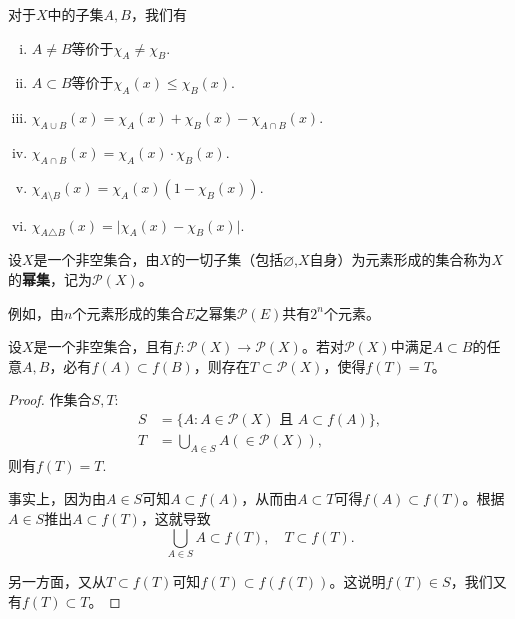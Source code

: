 \documentclass[../../main.tex]{subfiles}
\begin{document}
\begin{proposition}[示性函数的基本性质]\label{proposition:示性函数的基本性质}
  对于\(X\)中的子集\(A,B\)，我们有
\begin{enumerate}[(i)]
  \item \(A\neq B\)等价于\(\chi_A\neq\chi_B\).

  \item \(A\subset B\)等价于\(\chi_A(x)\leqslant\chi_B(x)\).

  \item \(\chi_{A\cup B}(x)=\chi_A(x)+\chi_B(x)-\chi_{A\cap B}(x)\).

  \item \(\chi_{A\cap B}(x)=\chi_A(x)\cdot\chi_B(x)\).

  \item \(\chi_{A\setminus B}(x)=\chi_A(x)(1 - \chi_B(x))\).
  
  \item \(\chi_{A\triangle B}(x)=\vert\chi_A(x)-\chi_B(x)\vert\).
\end{enumerate}
\end{proposition}

\begin{definition}[幂集]\label{definition:幂集}
  设\(X\)是一个非空集合，由\(X\)的一切子集（包括\(\varnothing\),\(X\)自身）为元素形成的集合称为\(X\)的\textbf{幂集}，记为\(\mathcal{P}(X)\)。
\end{definition}
\begin{note}
  例如，由\(n\)个元素形成的集合\(E\)之幂集\(\mathcal{P}(E)\)共有\(2^n\)个元素。
\end{note}

\begin{example}[单调映射的不动点]\label{example:单调映射的不动点}
设\(X\)是一个非空集合，且有\(f:\mathcal{P}(X)\to\mathcal{P}(X)\)。若对\(\mathcal{P}(X)\)中满足\(A\subset B\)的任意\(A,B\)，必有\(f(A)\subset f(B)\)，则存在\(T\subset\mathcal{P}(X)\)，使得\(f(T)=T\)。
\end{example}
\begin{proof}
作集合\(S,T\):
\begin{align*}
S&=\{A:A\in\mathcal{P}(X)\text{ 且 }A\subset f(A)\},\\
T&=\bigcup_{A\in S}A(\in\mathcal{P}(X)),
\end{align*}
则有\(f(T)=T\).

事实上，因为由\(A\in S\)可知\(A\subset f(A)\)，从而由\(A\subset T\)可得\(f(A)\subset f(T)\)。根据\(A\in S\)推出\(A\subset f(T)\)，这就导致
\[
\bigcup_{A\in S}A\subset f(T),\quad T\subset f(T).
\]

另一方面，又从\(T\subset f(T)\)可知\(f(T)\subset f(f(T))\)。这说明\(f(T)\in S\)，我们又有\(f(T)\subset T\)。

\end{proof}
\end{document}
